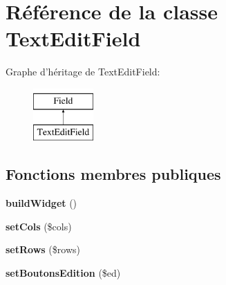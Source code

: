 \hypertarget{class_library_1_1_text_edit_field}{\section{Référence de la classe Text\+Edit\+Field}
\label{class_library_1_1_text_edit_field}
}
Graphe d'héritage de Text\+Edit\+Field\+:\begin{figure}[H]
\begin{center}
\leavevmode
\includegraphics[height=2.000000cm]{class_library_1_1_text_edit_field}
\end{center}
\end{figure}
\subsection*{Fonctions membres publiques}
\begin{DoxyCompactItemize}
\item 
\hypertarget{class_library_1_1_text_edit_field_a3724547eb0ec2b00884571328d7e2d5d}{{\bfseries build\+Widget} ()}\label{class_library_1_1_text_edit_field_a3724547eb0ec2b00884571328d7e2d5d}

\item 
\hypertarget{class_library_1_1_text_edit_field_a74f4829a0cf765fdd6934099f4c32dd6}{{\bfseries set\+Cols} (\$cols)}\label{class_library_1_1_text_edit_field_a74f4829a0cf765fdd6934099f4c32dd6}

\item 
\hypertarget{class_library_1_1_text_edit_field_ac0f6b8d18fd3c935cfc7df9e6f8ccc64}{{\bfseries set\+Rows} (\$rows)}\label{class_library_1_1_text_edit_field_ac0f6b8d18fd3c935cfc7df9e6f8ccc64}

\item 
\hypertarget{class_library_1_1_text_edit_field_afc687a4d76877e9fa6ecc809c90f9cf9}{{\bfseries set\+Boutons\+Edition} (\$ed)}\label{class_library_1_1_text_edit_field_afc687a4d76877e9fa6ecc809c90f9cf9}

\end{DoxyCompactItemize}
